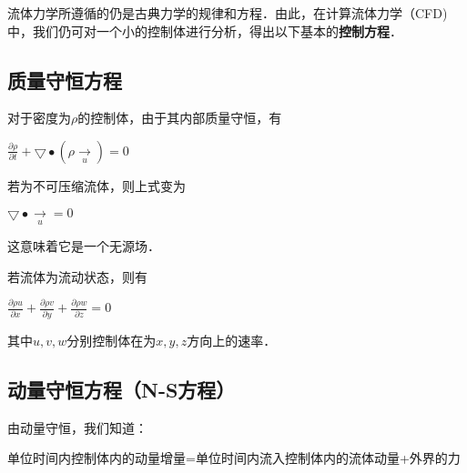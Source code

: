 
\begin{issues}
\issueDraft
\end{issues}


流体力学所遵循的仍是古典力学的规律和方程．由此，在计算流体力学（CFD)中，我们仍可对一个小的控制体进行分析，得出以下基本的\textbf{控制方程}．

\subsection{质量守恒方程}
对于密度为$\rho$的控制体，由于其内部质量守恒，有

$\frac{\partial \rho }{\partial t}+\bigtriangledown \bullet (\rho \underset{u}{\rightarrow})=0$

若为不可压缩流体，则上式变为

$\bigtriangledown\bullet \underset{u}{\rightarrow} =0$

这意味着它是一个无源场．

若流体为流动状态，则有

$\frac{\partial \rho u}{\partial x}+\frac{\partial \rho v}{\partial y}+\frac{\partial \rho w}{\partial z}=0$

其中$u,v,w$分别控制体在为$x,y,z$方向上的速率．


\subsection{动量守恒方程（N-S方程）}
由动量守恒，我们知道：

单位时间内控制体内的动量增量=单位时间内流入控制体内的流体动量+外界的力

